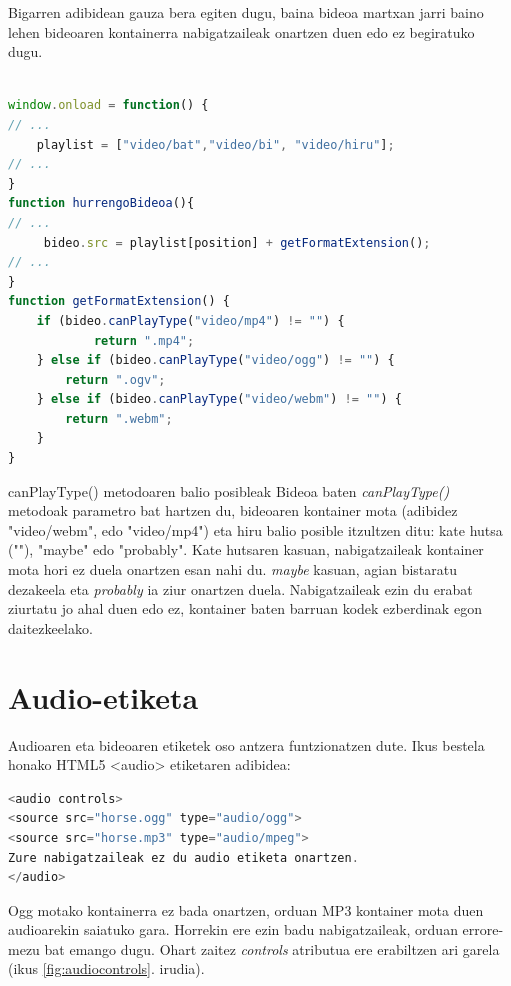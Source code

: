 Bigarren adibidean gauza bera egiten dugu, baina bideoa martxan jarri baino lehen bideoaren kontainerra nabigatzaileak onartzen duen edo ez begiratuko dugu. 

\begin{lstlisting}[language=JavaScript]

window.onload = function() {
// ...
	playlist = ["video/bat","video/bi", "video/hiru"];
// ...
}
function hurrengoBideoa(){
// ...
     bideo.src = playlist[position] + getFormatExtension();
// ...
}
function getFormatExtension() {
    if (bideo.canPlayType("video/mp4") != "") {
    	    return ".mp4";
    } else if (bideo.canPlayType("video/ogg") != "") {
        return ".ogv";
    } else if (bideo.canPlayType("video/webm") != "") {
        return ".webm";
    }
}
\end{lstlisting}


 \begin{alertinfo}{canPlayType() metodoaren balio posibleak}
        Bideoa baten \textit{canPlayType()} metodoak parametro bat hartzen du, bideoaren kontainer mota (adibidez "video/webm", edo "video/mp4") eta hiru balio posible itzultzen ditu: kate hutsa (""), "maybe" edo "probably". Kate hutsaren kasuan, nabigatzaileak kontainer mota hori ez duela onartzen esan nahi du. \textit{maybe} kasuan, agian bistaratu dezakeela eta \textit{probably} ia ziur onartzen duela. Nabigatzaileak ezin du erabat ziurtatu jo ahal duen edo ez, kontainer baten barruan kodek ezberdinak egon daitezkeelako.
    \end{alertinfo}

\section{Audio-etiketa}

Audioaren eta bideoaren etiketek oso antzera funtzionatzen dute. Ikus bestela honako HTML5 <audio> etiketaren adibidea:

\begin{lstlisting}[language=JavaScript]
<audio controls>
<source src="horse.ogg" type="audio/ogg">
<source src="horse.mp3" type="audio/mpeg">
Zure nabigatzaileak ez du audio etiketa onartzen.
</audio>
\end{lstlisting}

Ogg motako kontainerra ez bada onartzen, orduan MP3 kontainer mota duen audioarekin saiatuko gara. Horrekin ere ezin badu nabigatzaileak, orduan errore-mezu bat emango dugu. Ohart zaitez \textit{controls} atributua ere erabiltzen ari garela (ikus \ref{fig:audiocontrols}. irudia).

